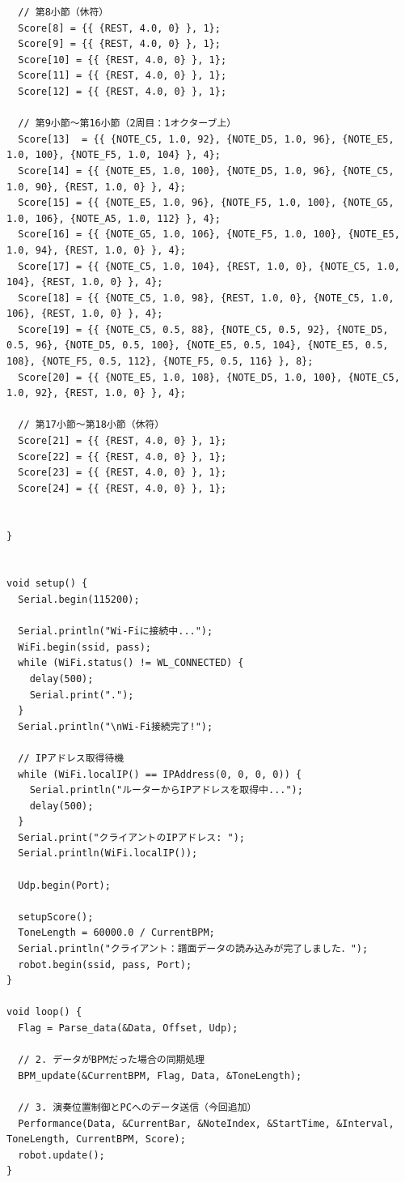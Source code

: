 \begin{lstlisting}
  // 第8小節（休符）
  Score[8] = {{ {REST, 4.0, 0} }, 1};
  Score[9] = {{ {REST, 4.0, 0} }, 1};
  Score[10] = {{ {REST, 4.0, 0} }, 1};
  Score[11] = {{ {REST, 4.0, 0} }, 1};
  Score[12] = {{ {REST, 4.0, 0} }, 1};

  // 第9小節〜第16小節（2周目：1オクターブ上）
  Score[13]  = {{ {NOTE_C5, 1.0, 92}, {NOTE_D5, 1.0, 96}, {NOTE_E5, 1.0, 100}, {NOTE_F5, 1.0, 104} }, 4};
  Score[14] = {{ {NOTE_E5, 1.0, 100}, {NOTE_D5, 1.0, 96}, {NOTE_C5, 1.0, 90}, {REST, 1.0, 0} }, 4};
  Score[15] = {{ {NOTE_E5, 1.0, 96}, {NOTE_F5, 1.0, 100}, {NOTE_G5, 1.0, 106}, {NOTE_A5, 1.0, 112} }, 4};
  Score[16] = {{ {NOTE_G5, 1.0, 106}, {NOTE_F5, 1.0, 100}, {NOTE_E5, 1.0, 94}, {REST, 1.0, 0} }, 4};
  Score[17] = {{ {NOTE_C5, 1.0, 104}, {REST, 1.0, 0}, {NOTE_C5, 1.0, 104}, {REST, 1.0, 0} }, 4};
  Score[18] = {{ {NOTE_C5, 1.0, 98}, {REST, 1.0, 0}, {NOTE_C5, 1.0, 106}, {REST, 1.0, 0} }, 4};
  Score[19] = {{ {NOTE_C5, 0.5, 88}, {NOTE_C5, 0.5, 92}, {NOTE_D5, 0.5, 96}, {NOTE_D5, 0.5, 100}, {NOTE_E5, 0.5, 104}, {NOTE_E5, 0.5, 108}, {NOTE_F5, 0.5, 112}, {NOTE_F5, 0.5, 116} }, 8};
  Score[20] = {{ {NOTE_E5, 1.0, 108}, {NOTE_D5, 1.0, 100}, {NOTE_C5, 1.0, 92}, {REST, 1.0, 0} }, 4};

  // 第17小節〜第18小節（休符）
  Score[21] = {{ {REST, 4.0, 0} }, 1};
  Score[22] = {{ {REST, 4.0, 0} }, 1};
  Score[23] = {{ {REST, 4.0, 0} }, 1};
  Score[24] = {{ {REST, 4.0, 0} }, 1};

  
}


void setup() {
  Serial.begin(115200);

  Serial.println("Wi-Fiに接続中...");
  WiFi.begin(ssid, pass);
  while (WiFi.status() != WL_CONNECTED) {
    delay(500);
    Serial.print(".");
  }
  Serial.println("\nWi-Fi接続完了!");

  // IPアドレス取得待機
  while (WiFi.localIP() == IPAddress(0, 0, 0, 0)) {
    Serial.println("ルーターからIPアドレスを取得中...");
    delay(500);
  }
  Serial.print("クライアントのIPアドレス: ");
  Serial.println(WiFi.localIP());
  
  Udp.begin(Port);

  setupScore();
  ToneLength = 60000.0 / CurrentBPM;
  Serial.println("クライアント：譜面データの読み込みが完了しました．");
  robot.begin(ssid, pass, Port);
}

void loop() {
  Flag = Parse_data(&Data, Offset, Udp);
  
  // 2. データがBPMだった場合の同期処理
  BPM_update(&CurrentBPM, Flag, Data, &ToneLength);

  // 3. 演奏位置制御とPCへのデータ送信（今回追加）
  Performance(Data, &CurrentBar, &NoteIndex, &StartTime, &Interval, ToneLength, CurrentBPM, Score);
  robot.update();
}

\end{lstlisting}

